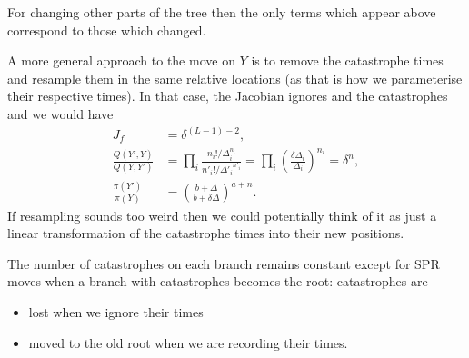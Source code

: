 \documentclass[11pt,a4paper]{article}
\newcommand{\Yp}{{Y'}}
\newcommand{\pY}{\pi(Y)}
\newcommand{\pYp}{\pi(\Yp)}
\renewcommand{\ni}{n_i}
\newcommand{\nip}{{n'}_i}
\newcommand{\Di}{\Delta_i}
\newcommand{\Dip}{{\Delta'}_i}
\begin{document}
For changing other parts of the tree then the only terms which appear above correspond to those which changed.

A more general approach to the move on $ Y $ is to remove the catastrophe times and resample them in the same relative locations (as that is how we parameterise their respective times). In that case, the Jacobian ignores and the catastrophes and we would have
\begin{align*}
    J_f &= \delta^{(L - 1) - 2}, \\
    \frac{Q(Y', Y)}{Q(Y, Y')}
        &= \prod_i \frac{\ni! / \Di^{\ni}}{\nip! / {\Dip}^{\nip}}
            = \prod_i \left(\frac{\delta \Di}{\Di}\right)^{\ni}
            = \delta^n,
        \\
    \frac{\pYp}{\pY}
        &= \left(\frac{b + \Delta}{b + \delta \Delta}\right)^{a + n}.
\end{align*}
If resampling sounds too weird then we could potentially think of it as just a linear transformation of the catastrophe times into their new positions.

The number of catastrophes on each branch remains constant except for SPR moves when a branch with catastrophes becomes the root: catastrophes are
\begin{itemize}
    \item lost when we ignore their times
    \item moved to the old root when we are recording their times.
\end{itemize}

\end{document}
